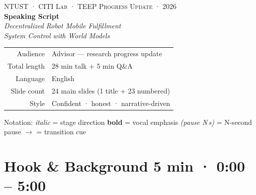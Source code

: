 \documentclass[11pt,a4paper]{article}
\begin{document}
\begin{titlepage}
\centering
\vspace*{2.5cm}
\textcolor{thMuted}{\textsc{\large NTUST · CITI Lab · TEEP Progress Update · 2026}}\\[2.5cm]
{\Huge\bfseries\color{thStrong} Speaking Script}\\[0.6cm]
{\Large\itshape\color{thAmber} Decentralized Robot Mobile Fulfillment\\
       System Control with World Models}\\[2.5cm]

\begin{tabular}{rl}
\textcolor{thMuted}{Audience}      & Advisor — research progress update \\[3pt]
\textcolor{thMuted}{Total length}  & 28 min talk + 5 min Q\&A \\[3pt]
\textcolor{thMuted}{Language}      & English \\[3pt]
\textcolor{thMuted}{Slide count}   & 24 main slides (1 title + 23 numbered) \\[3pt]
\textcolor{thMuted}{Style}         & Confident · honest · narrative-driven \\
\end{tabular}

\vfill
\textcolor{thMuted}{\small Notation: \emph{italic} = stage direction \quad
                          \textbf{bold} = vocal emphasis \quad
                          \emph{(pause N\,s)} = N-second pause \quad
                          $\rightarrow$ = transition cue}
\end{titlepage}

\section{Hook \& Background \hfill \textcolor{thMuted}{\small 5 min · 0:00 – 5:00}}
\end{document}
